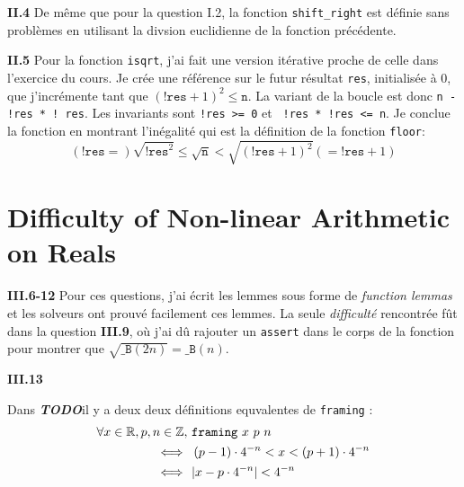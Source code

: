 \documentclass[9pt,a4paper,twocolumn]{article}
\theoremstyle{definition}
\newcommand{\Z}{\ensuremath\mathbb{Z}}
\newcommand{\R}{\ensuremath\mathbb{R}}
\newcommand{\B}{\texttt{\_B}}
\renewcommand{\leq}{\leqslant}
\newcommand{\TODO}{{\color{red}\textbf{\textit{TODO}}}}
\newenvironment{code}[1][ocaml]{%
\newgeometry{textwidth = 0.8\textwidth}
\VerbatimEnvironment\begin{verbatim}%
}{%
\end{verbatim}
\restoregeometry
}
\begin{document}
\textbf{II.4}
De même que pour la question I.2, la fonction \texttt{shift\_right} est définie
sans problèmes en utilisant la divsion euclidienne de la fonction
précédente.


\textbf{II.5}
Pour la fonction \texttt{isqrt}, j'ai fait une version itérative proche de
celle dans l'exercice du cours. Je crée une référence sur le futur résultat
\texttt{res}, initialisée à 0, que j'incrémente tant que
$
(\texttt{!res} +1)^2 \leq \texttt{n}
$.
La variant de la boucle est donc \texttt{n - !res * ! res}.
Les invariants sont \texttt{!res >= 0} et \texttt{ !res * !res <= n}.
Je conclue la fonction en montrant l'inégalité qui est la définition de la
fonction \texttt{floor}:
$$
(\texttt{!res} =)
\sqrt{\texttt{!res}^2} \leq \sqrt{\texttt{n}}
  < \sqrt{(\texttt{!res}+1)^2}
  (=\texttt{!res}+1)
$$


\section{Difficulty of Non-linear Arithmetic on Reals}

\textbf{III.6-12}
Pour ces questions, j'ai écrit les lemmes sous forme de
\textit{function lemmas} et les solveurs ont prouvé facilement ces lemmes.
La seule \textit{difficulté} rencontrée fût dans la question \textbf{III.9},
où j'ai dû rajouter un \texttt{assert} dans le corps de la fonction pour
montrer que $\sqrt{\B(2n)} = \B(n)$.

\textbf{III.13}

Dans \TODO il y a deux deux définitions equvalentes de \texttt{framing} :
\begin{align}
\forall x \in \R, p, n \in \Z,\  \nonumber
	& \texttt{framing}\ x\ p\ n \\
\Longleftrightarrow \ \
	& \left( p-1 \right) \cdot 4^{-n}
		< x <
		\left( p+1 \right) \cdot 4^{-n}
	\label{eq:fram-1} \\
\Longleftrightarrow \ \
	& |x-p\cdot 4^{-n}| < 4^{-n}
	\label{eq:fram-2}
\end{align}
\end{document}
